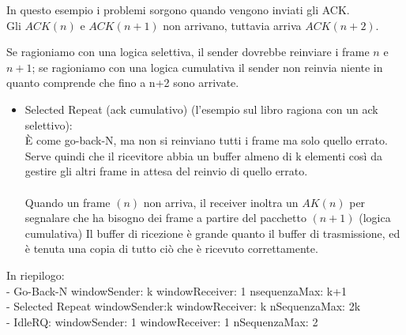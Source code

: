 \documentclass[11pt, oneside]{article}   	%
\begin{document}
\begin{itemize}
\begin{center}
\end{center}
In questo esempio i problemi sorgono quando vengono inviati gli ACK. \\Gli $ACK(n)$ e $ACK(n+1)$ non arrivano, tuttavia arriva $ACK(n+2)$. 
\end{itemize}
Se ragioniamo con una logica selettiva, il sender dovrebbe reinviare i frame $n$ e $n+1$; se ragioniamo con una logica cumulativa il sender non reinvia niente in quanto comprende che fino a n+2 sono arrivate.
\begin{itemize}
\item Selected Repeat (ack cumulativo) (l'esempio sul libro ragiona con un ack selettivo):\\
È come go-back-N, ma non si reinviano tutti i frame ma solo quello errato. Serve quindi che il ricevitore abbia un buffer almeno di k elementi così da gestire gli altri frame in attesa del reinvio di quello errato.\\\\
Quando un frame $(n)$ non arriva, il receiver inoltra un $AK(n)$ per segnalare che ha bisogno dei frame a partire del pacchetto $(n + 1)$ (logica cumulativa) Il buffer di ricezione è grande quanto il buffer di trasmissione, ed è tenuta una copia di tutto ciò che è ricevuto correttamente.\\

\end{itemize}
In riepilogo:\\
- Go-Back-N \hfill windowSender: k \hfill windowReceiver: 1 \hfill nsequenzaMax: k+1\\
- Selected Repeat \hfill windowSender:k \hfill windowReceiver: k \hfill nSequenzaMax: 2k\\
- IdleRQ: \hfill windowSender: 1 \hfill windowReceiver: 1 \hfill nSequenzaMax: 2\\
\end{document}
